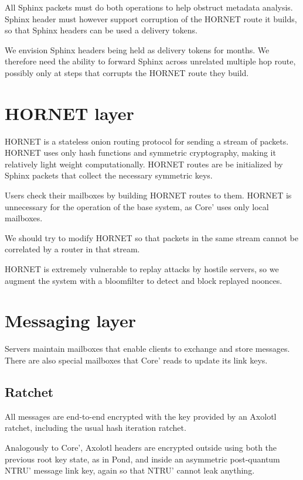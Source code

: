 All Sphinx packets must do both operations to help obstruct metadata
analysis.  Sphinx header must however support corruption of the HORNET
route it builds, so that Sphinx headers can be used a delivery tokens.

We envision Sphinx headers being held as delivery tokens for months.  We
therefore need the ability to forward Sphinx across unrelated multiple
hop route, possibly only at steps that corrupts the HORNET route they
build.  


\section{HORNET layer}

HORNET is a stateless onion routing protocol for sending a stream of
packets.  HORNET uses only hash functions and symmetric cryptography,
making it relatively light weight computationally.  HORNET routes are be
initialized by Sphinx packets that collect the necessary symmetric keys.

Users check their mailboxes by building HORNET routes to them.  HORNET
is unnecessary for the operation of the base system, as Core' uses only
local mailboxes. 

We should try to modify HORNET so that packets in the same stream cannot
be correlated by a router in that stream.

HORNET is extremely vulnerable to replay attacks by hostile servers, so
we augment the system with a bloomfilter to detect and block replayed
noonces.


\section{Messaging layer}

Servers maintain mailboxes that enable clients to exchange and store
messages.  There are also special mailboxes that Core' reads to update
its link keys.

\subsection{Ratchet}

All messages are end-to-end encrypted with the key provided by an
Axolotl ratchet, including the usual hash iteration ratchet.

Analogously to Core', Axolotl headers are encrypted outside using both
the previous root key state, as in Pond, and inside an asymmetric
post-quantum NTRU' message link key, again so that NTRU' cannot leak
anything.

